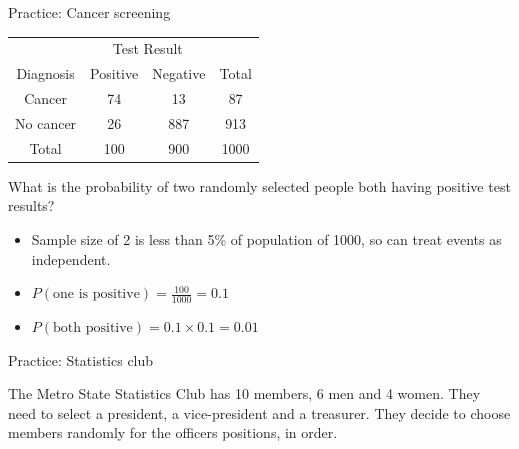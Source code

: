 \documentclass[xcolor=table, aspectratio=169, bigger, handout]{beamer}
\begin{document}
\begin{frame}{Practice: Cancer screening}
\begin{block}{}
{\centering
\begin{tabular}{c | c  c | c}
\multicolumn{1}{c}{} & \multicolumn{2}{c}{Test Result}\\
Diagnosis & Positive & Negative & Total \\
\hline
Cancer & 74 & 13 & 87\\
No cancer & 26 & 887 & 913\\
\hline
Total & 100 & 900 & 1000
\end{tabular}\par
}
\end{block}

\begin{exampleblock}{}
What is the probability of two randomly selected people both having positive test results?

\begin{itemize}
\pause
\item Sample size of 2 is less than 5\% of population of 1000, so can treat events as independent.
\pause
\item $P(\text{one is positive}) = \frac {100}{1000} = 0.1$
\pause
\item $P(\text{both positive}) = 0.1 \times 0.1 = 0.01$
\end{itemize}
\end{exampleblock}

\end{frame}

\begin{frame}{Practice: Statistics club}
\begin{block}{}
The Metro State Statistics Club has 10 members, 6 men and 4 women. They need to select a president, a vice-president and a treasurer. They decide to choose members randomly for the officers positions, in order.
\end{block}
\end{frame}
\end{document}

